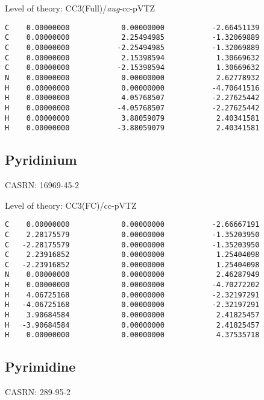 \documentclass[journal=jctcce,manuscript=article,layout=traditional]{achemso}
\newcommand{\TZ}{cc-pVTZ}
\newcommand{\AVTZ}{\emph{aug}-cc-pVTZ}
\begin{document}
\begin{singlespace}
\noindent Level of theory: CC3(Full)/{\AVTZ}
\begin{verbatim}
C    0.00000000            0.00000000           -2.66451139
C    0.00000000            2.25494985           -1.32069889
C    0.00000000           -2.25494985           -1.32069889
C    0.00000000            2.15398594            1.30669632
C    0.00000000           -2.15398594            1.30669632
N    0.00000000            0.00000000            2.62778932
H    0.00000000            0.00000000           -4.70641516
H    0.00000000            4.05768507           -2.27625442
H    0.00000000           -4.05768507           -2.27625442 
H    0.00000000            3.88059079            2.40341581
H    0.00000000           -3.88059079            2.40341581
\end{verbatim}
\end{singlespace}

\subsection{Pyridinium}

CASRN: 16969-45-2

\begin{singlespace}
\noindent Level of theory: CC3(FC)/{\TZ}
\begin{verbatim}
C    0.00000000            0.00000000           -2.66667191
C    2.28175579            0.00000000           -1.35203950
C   -2.28175579            0.00000000           -1.35203950
C    2.23916852            0.00000000            1.25404098
C   -2.23916852            0.00000000            1.25404098
N    0.00000000            0.00000000            2.46287949
H    0.00000000            0.00000000           -4.70272202
H    4.06725168            0.00000000           -2.32197291
H   -4.06725168            0.00000000           -2.32197291
H    3.90684584            0.00000000            2.41825457
H   -3.90684584            0.00000000            2.41825457
H    0.00000000            0.00000000            4.37535718
\end{verbatim}
\end{singlespace}

\subsection{Pyrimidine}

CASRN: 289-95-2
\end{document}
